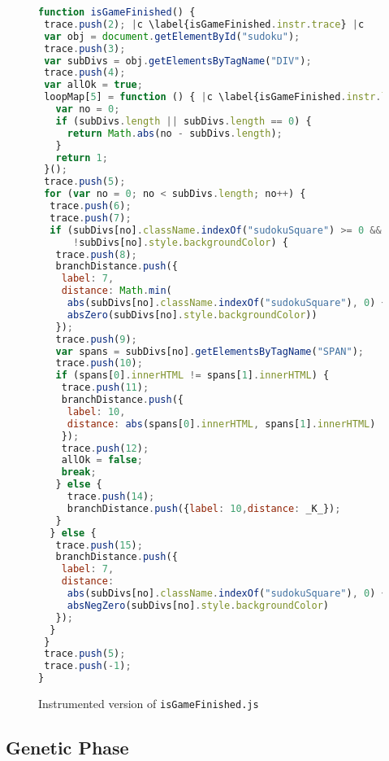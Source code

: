 \documentclass[sigconf,review,anonymous]{acmart}
\begin{document}
\begin{figure}[t]
  \begin{lstlisting}[style=htmlcssjs,language=JavaScript]
function isGameFinished() {
 trace.push(2); |c \label{isGameFinished.instr.trace} |c
 var obj = document.getElementById("sudoku");
 trace.push(3);
 var subDivs = obj.getElementsByTagName("DIV");
 trace.push(4);
 var allOk = true;
 loopMap[5] = function () { |c \label{isGameFinished.instr.loopMap} |c
   var no = 0;
   if (subDivs.length || subDivs.length == 0) {
     return Math.abs(no - subDivs.length);
   }
   return 1;
 }();
 trace.push(5);
 for (var no = 0; no < subDivs.length; no++) {
  trace.push(6);
  trace.push(7);
  if (subDivs[no].className.indexOf("sudokuSquare") >= 0 &&
      !subDivs[no].style.backgroundColor) {
   trace.push(8);
   branchDistance.push({ 
    label: 7, 
    distance: Math.min(
     abs(subDivs[no].className.indexOf("sudokuSquare"), 0) + _K_, 
     absZero(subDivs[no].style.backgroundColor))
   });
   trace.push(9);
   var spans = subDivs[no].getElementsByTagName("SPAN");
   trace.push(10);
   if (spans[0].innerHTML != spans[1].innerHTML) {
    trace.push(11);
    branchDistance.push({
     label: 10,
     distance: abs(spans[0].innerHTML, spans[1].innerHTML)
    });
    trace.push(12);
    allOk = false;
    break;
   } else {
     trace.push(14);
     branchDistance.push({label: 10,distance: _K_});
   }
  } else {
   trace.push(15);
   branchDistance.push({
    label: 7,
    distance: 
     abs(subDivs[no].className.indexOf("sudokuSquare"), 0) + 
     absNegZero(subDivs[no].style.backgroundColor)
   });
  }
 }
 trace.push(5);
 trace.push(-1);
}
\end{lstlisting}
  \caption{Instrumented version of \texttt{isGameFinished.js} }
  \label{code.isGameFinished.instr}
\end{figure}

\subsection{Genetic Phase}
\label{sub.sec.genetic.phase}
\end{document}
